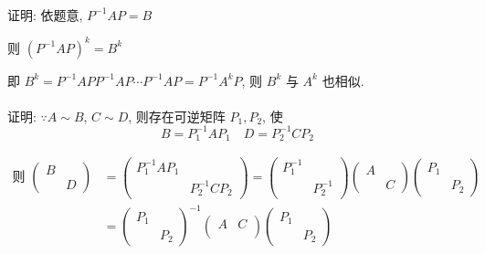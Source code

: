 	 \paragraph{} %
		 证明: 依题意, \( P^{-1}AP = B \)

		 则 \( (P^{-1}AP)^{k} = B^{k} \)

		 即 \( B^{k} = P^{-1}APP^{-1}AP\cdots P^{-1}AP = P^{-1}A^{k}P \), 则 \( B^{k} \) 与 \( A^{k} \) 也相似.


	 \paragraph{} %
		 证明: \( \because A \sim B \), \( C \sim D \), 则存在可逆矩阵 \( P_{1}, P_{2} \), 使
		 \[ B = P_{1}^{-1}AP_{1} \quad D = P_{2}^{-1}CP_{2} \]

		 \(
		 \begin{aligned}
			 \text{则 }\begin{pmatrix}
				          B &   \\
				            & D
			          \end{pmatrix}
			  & = \begin{pmatrix}
				      P_{1}^{-1}AP_{1} &                  \\
				                       & P_{2}^{-1}CP_{2}
			      \end{pmatrix} = \begin{pmatrix}
				                      P_{1}^{-1} &            \\
				                                 & P_{2}^{-1}
			                      \end{pmatrix}\begin{pmatrix}
				                                   A &   \\
				                                     & C
			                                   \end{pmatrix}\begin{pmatrix}
				                                                P_{1} &       \\
				                                                      & P_{2}
			                                                \end{pmatrix} \\
			  & = \begin{pmatrix}
				      P_{1} &       \\
				            & P_{2}
			      \end{pmatrix}^{-1}\begin{pmatrix}
				                        A & C \\
				                          &
			                        \end{pmatrix}\begin{pmatrix}
				                                     P_{1} &       \\
				                                           & P_{2}
			                                     \end{pmatrix}
		 \end{aligned} \)

